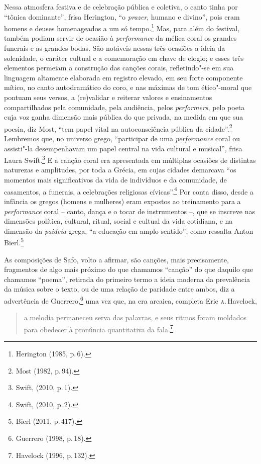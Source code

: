 Nessa atmosfera festiva e de celebração pública e coletiva, o canto tinha por
“tônica dominante”, frisa Herington, “o \textit{prazer}, humano e
divino”, pois eram homens e deuses homenageados a um só tempo.\footnote{ Herington (1985, p.\,6).} Mas, para além
do festival, também podiam servir de ocasião à
\textit{performance} da mélica coral os grandes funerais e as grandes bodas.
São notáveis nessas três ocasiões a ideia da
solenidade, o caráter cultual e a comemoração em chave de elogio; e esses
três elementos permeiam a construção das canções corais, refletindo"-se
em sua linguagem altamente elaborada em registro elevado, em seu forte
componente mítico, no canto autodramático do coro, e nas máximas de tom
ético"-moral que pontuam seus versos, a (re)validar e reiterar valores e
ensinamentos compartilhados pela comunidade, pela audiência, pelos
\textit{performers}, pelo poeta cuja voz ganha dimensão mais
pública do que privada, na medida em que sua poesia, diz Most,
“tem papel vital na autoconsciência pública da cidade”.\footnote{Most (1982, p.\,94).}
Lembremos que, no universo grego, “participar de uma \textit{performance} coral ou assisti"-la desempenhavam um papel central na vida cultural e musical”, frisa Laura Swift.\footnote{Swift, (2010, p.\,1).} E a canção coral era apresentada em múltiplas ocasiões de distintas naturezas e amplitudes, por toda a Grécia, em cujas cidades demarcava “os momentos mais significativos da vida de indivíduos e da comunidade, de casamentos, a funerais, a celebrações religiosas cívicas”.\footnote{Swift, (2010, p.\,2).} Por conta disso, desde a infância os gregos (homens e mulheres) eram expostos ao treinamento para a \textit{performance} coral -- canto, dança e o tocar de instrumentos --, que se inscreve nas dimensões política, cultural, ritual, social e cultual da vida cotidiana, e na dimensão da \textit{paideía} grega, “a educação em amplo sentido”, como ressalta Anton Bierl.\footnote{Bierl (2011, p.\,417).}

As composições de Safo, volto a afirmar, são canções, mais
precisamente, fragmentos de algo mais próximo do que chamamos “canção” do que
daquilo que chamamos “poema”, retirada do primeiro termo a ideia moderna da
prevalência da música sobre o texto, ou de uma relação de paridade entre ambos,
diz a advertência de Guerrero,\footnote{ Guerrero (1998, p.\,18).} uma vez que, na era arcaica,
completa Eric \textsc{a}.\,Havelock, 

\begin{quote}
a melodia permaneceu serva
das palavras, e seus ritmos foram moldados para obedecer à pronúncia
quantitativa da fala.\footnote{ Havelock (1996, p.\,132).}
\end{quote}

